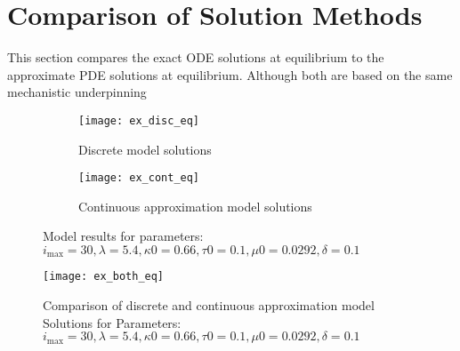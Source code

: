 \documentclass[review]{elsarticle}
\newcommand{\imax}{\ensuremath{i_{\max}}\xspace}
\begin{document}
\section{Comparison of Solution Methods}
This section compares the exact ODE solutions at equilibrium to the approximate PDE solutions at equilibrium.
Although both are based on the same mechanistic underpinning 

\begin{figure}[ht]
\centering
\begin{subfigure}[ht]{0.4\textwidth}
\texttt{[image: ex\_disc\_eq]}
\caption{Discrete model solutions}
\end{subfigure}
\begin{subfigure}[ht]{0.4\textwidth}
\texttt{[image: ex\_cont\_eq]}
\caption{Continuous approximation model solutions}
\end{subfigure}
\caption{Model results for parameters: $\imax=30,\lambda=5.4,\kappa 0=0.66,\tau 0=0.1,\mu 0=0.0292,\delta=0.1$}
\end{figure}

\begin{figure}[ht]
\centering
\texttt{[image: ex\_both\_eq]}
\caption{Comparison of discrete and continuous approximation model Solutions for Parameters: $\imax=30,\lambda=5.4,\kappa 0=0.66,\tau 0=0.1,\mu 0=0.0292,\delta=0.1$}
\end{figure}
\end{document}
